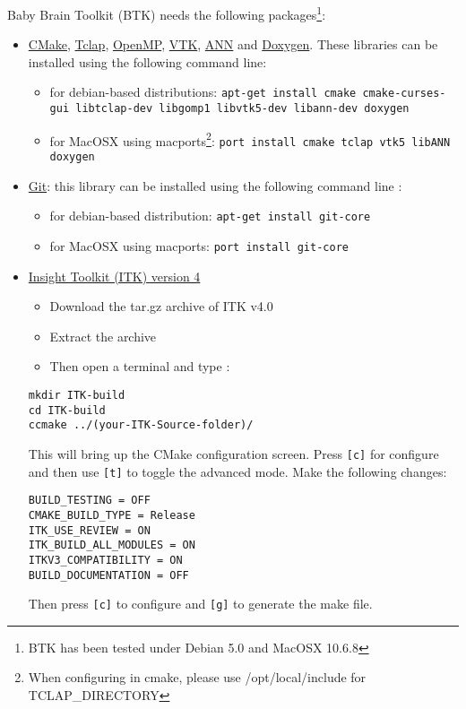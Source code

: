\documentclass[a4paper,10pt]{article}
\begin{document}
Baby Brain Toolkit (BTK) needs the following packages\footnote{BTK has been tested under Debian 5.0 and MacOSX 10.6.8}:
\begin{itemize}
 \item \href{http://www.cmake.org}{CMake}, \href{http://tclap.sourceforge.net}{Tclap}, \href{http://openmp.org}{OpenMP}, \href{http://www.vtk.org}{VTK}, \href{http://www.cs.umd.edu/\string~mount/ANN}{ANN} and \href{http://www.doxygen.org}{Doxygen}. These libraries can be installed using the following command line:
 \begin{itemize}
 \item for debian-based distributions: \texttt{apt-get install cmake
cmake-curses-gui libtclap-dev libgomp1 libvtk5-dev libann-dev doxygen}
 \item for MacOSX using macports\footnote{When configuring in cmake, please use /opt/local/include for TCLAP\_DIRECTORY}: \texttt{port install cmake tclap vtk5 libANN doxygen}
 \end{itemize}
 \item \href{http://git-scm.com/}{Git}: this library can be installed using the following command line :
 \begin{itemize}
 \item for debian-based distribution: \texttt{apt-get install git-core}
 \item for MacOSX using macports: \texttt{port install git-core}
 \end{itemize}
 \item \href{http://www.itk.org/ITK/resources/software.html}{Insight Toolkit (ITK) version 4}
 \begin{itemize}
 \item Download the tar.gz archive of ITK v4.0
 \item Extract the archive 
 \item Then open a terminal and type :
 \end{itemize}
\begin{verbatim}
mkdir ITK-build
cd ITK-build
ccmake ../(your-ITK-Source-folder)/
\end{verbatim}
This will bring up the CMake configuration screen. Press \texttt{[c]} for
configure and then use \texttt{[t]} to toggle the advanced mode. Make the
following changes:
\begin{verbatim}
BUILD_TESTING = OFF
CMAKE_BUILD_TYPE = Release
ITK_USE_REVIEW = ON
ITK_BUILD_ALL_MODULES = ON
ITKV3_COMPATIBILITY = ON
BUILD_DOCUMENTATION = OFF
\end{verbatim}
Then press \texttt{[c]} to configure and \texttt{[g]} to generate the make file.

\end{itemize}
\end{document}
